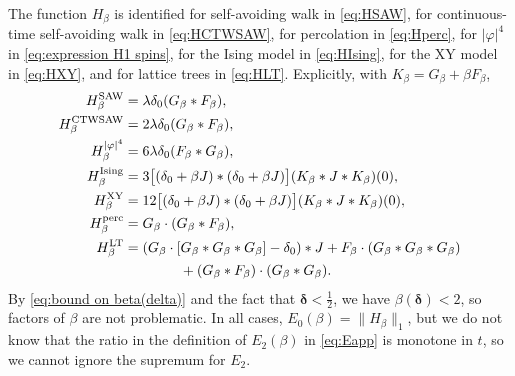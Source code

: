 \documentclass[11pt,a4paper]{article}
\numberwithin{equation}{section}
\theoremstyle{plain}
\theoremstyle{definition}
\newcommand\1{\mathds{1}}
\newcommand{\deltamain}{\boldsymbol{\delta}}
\begin{document}
The function $H_\beta$ is identified
for self-avoiding walk in \eqref{eq:HSAW},
for continuous-time self-avoiding walk in \eqref{eq:HCTWSAW},
for percolation in \eqref{eq:Hperc},
for $|\varphi|^4$ in \eqref{eq:expression H1 spins},
for the Ising model in \eqref{eq:HIsing},
for the XY model in \eqref{eq:HXY},
and for lattice trees in \eqref{eq:HLT}.
Explicitly, with $K_\beta=G_\beta+\beta F_\beta$,
\begin{align}
\label{eq:HSAWII}
    H^{\rm SAW}_\beta &=\lambda \delta_{0}(G_\beta*F_\beta) , \\
\label{eq:HCTWSAWII}
    H_\beta^{\rm CTWSAW} &= 2\lambda \delta_{0}(G_\beta*F_\beta),\\
\label{eq:Hphi4II}
    H^{|\varphi|^4}_\beta &=6\lambda \delta_0 (F_\beta*G_\beta) , \\
\label{eq:HIsingII}
    H_\beta^{\rm Ising} &=3\big[ (\delta_0+\beta J)*(\delta_0+\beta J)\big] (K_\beta*J*K_\beta)(0),\\
\label{eq:HXYII}
    H_\beta^{\rm XY} &=12 \big[ (\delta_0+\beta J)*(\delta_0+\beta J) \big] (K_\beta*J*K_\beta)(0),\\
\label{eq:HpercII}
    H^{{\rm{perc}}}_\beta  &= G_\beta \cdot (G_\beta*F_\beta) , \\
\label{eq:HLTII}
    H^{{\rm{LT}}}_{\beta}
    &= (G_{\beta} \cdot [G_{\beta}*G_{\beta}*G_{\beta}] - \delta_0 )*J
    + F_{\beta}\cdot (G_{\beta}*G_{\beta}*G_{\beta})
    \nonumber \\ & \qquad\qquad + (G_{\beta}*F_{\beta}) \cdot ( G_{\beta}*G_{\beta}) .
\end{align}
By \eqref{eq:bound on beta(delta)} and the fact that
$\deltamain < \frac 12$, we have $\beta(\deltamain) < 2$, so
factors of $\beta$ are not problematic.
In all cases, $E_0(\beta)=\|H_\beta\|_1$, but we do not know that the ratio in the definition of $E_2(\beta)$ in \eqref{eq:Eapp} is monotone in $t$, so we cannot ignore the supremum for $E_2$.
\end{document}
